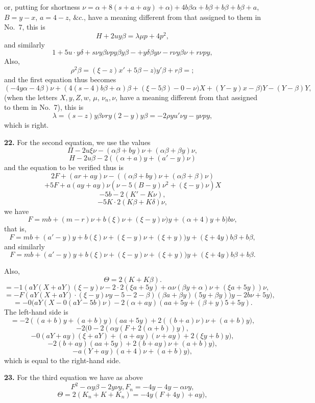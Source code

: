\documentclass[11pt,a4paper]{article}
\begin{document}
or, putting for shortness $\nu = \alpha + 8(s + a + ay) + \alpha) + 4b\beta\alpha + b\beta + b\beta + b\beta + a$,
$B = y - x$, $a = 4 - z$, $\&c.$, have a meaning different from that assigned to them in No.\ 7, this is
\[
H + 2u y\beta = \lambda \mu p + 4p^2,
\]
and similarly
\[
1 + 5u \cdot y\delta + s\nu y\beta\nu p y\beta y\beta - + y\delta\beta y\nu - r\nu y\beta\nu + r\nu p y,
\]
Also,
\[
\rho^2 \beta = (\xi - z)x' + 5\beta - z) y'\beta + r\beta = ;
\]
and the first equation thus becomes
\[
(- 4y\alpha - 4\beta)\nu + (4(s - 4)b\beta + \alpha)\beta + (\xi - 5\beta) - 0 - \nu)X + (Y - y)x - \beta)Y - (Y - \beta)Y,
\]
(when the letters $X, y, Z, w$, $\mu$, $\nu_n, \nu$, have a meaning different from that assigned to them in No.\ 7), this is
\[
\lambda = (s - z) y\beta\nu r y(2 - y) y\beta = - 2\rho y u'\nu y - y\nu p y,
\]
which is right.

\textbf{22.} For the second equation, we use the values
\[
\Pi - 2u\xi\nu - (\alpha\beta + by)\nu + (\alpha\beta + \beta y)\nu,
\]
\[
H - 2u\beta - 2((\alpha + a) y + (a' - y)\nu)
\]
and the equation to be verified thus is
\[
2F + (a r + a y)\nu - ((\alpha\beta + by)\nu + (\alpha\beta + \beta)\nu)
\]
\[
+ 5F + a (a y + a y)\nu(\nu - 5(B - y)\nu^2 + (\xi - y)\nu)X
\]
\[
- 5b - 2(K' - K\nu),
\]
\[
- 5K \cdot 2(K\beta + K\delta)\nu,
\]
we have
\[
F = mb + (m - r)\nu + b(\xi)\nu + (\xi - y)\nu)y + (\alpha + 4)y + b)b\nu,
\]
that is,
\[
F = m b + (a' - y)y + b(\xi)\nu + (\xi - y)\nu + (\xi + y))y + (\xi + 4y)b\beta + b\beta,
\]
and similarly
\[
F = mb + (a' - y)y + b(\xi)\nu + (\xi - y)\nu + (\xi + y))y + (\xi + 4y)b\beta + b\beta.
\]

Also,
\[
\Theta = 2(K + K\beta).
\]
\[
= - 1(a Y(X + a Y)(\xi - y)\nu - 2 \cdot 2(\xi a + 5y) + \alpha\nu(\beta y + \alpha)\nu + (\xi a + 5y))\nu,
\]
\[
= - F(a Y(X + a Y) \cdot (\xi - y)\nu y - 5 - 2 - \beta)(\beta a + \beta y) (5y + \beta y))y - 2 b\nu + 5 y),
\]
\[
= - 0(a Y(X - 0(a Y - 5b)\nu) - 2(\alpha + a y)(a a + 5y + (\beta + y)5 + 5 y).
\]
The left-hand side is
\[
= - 2((a + b)y + (a + b)y)(a a + 5y) + 2((b + a)\nu)\nu + (a + b)y),
\]
\[
- 2(0 - 2(\alpha y(F + 2(\alpha + b))y),
\]
\[
- 0(a Y + a y)(\xi + a Y) + (a + a y)(\nu + a y) + 2(\xi y + b)y),
\]
\[
- 2(b + a y)(a a + 5y) + 2(b + a y)\nu + (a + b)y),
\]
\[
- a (Y + a y)(a + 4)\nu + (a + b)y),
\]
which is equal to the right-hand side.

\textbf{23.} For the third equation we have as above
\[
F^2 - \alpha y\beta - 2y\nu y, F_n = - 4y - 4y - \alpha\nu y,
\]
\[
\Theta = 2(K_n + K + K_n) = - 4y(F + 4y) + a y),
\]
\end{document}
